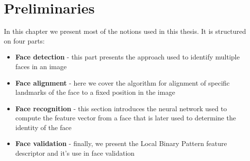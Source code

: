 \chapter{Preliminaries}

In this chapter we present most of the notions used in this thesis. It is structured on four parts:
\begin{itemize}
	\item \textbf{Face detection} - this part presents the approach used to identify multiple faces in an image
	\item \textbf{Face alignment} - here we cover the algorithm for alignment of specific landmarks of the face to a fixed position in the image
	\item \textbf{Face recognition} - this section introduces the neural network used to compute the feature vector from a face that is later used to determine the identity of the face
	\item \textbf{Face validation} - finally, we present the Local Binary Pattern feature descriptor and it's use in face validation
\end{itemize}